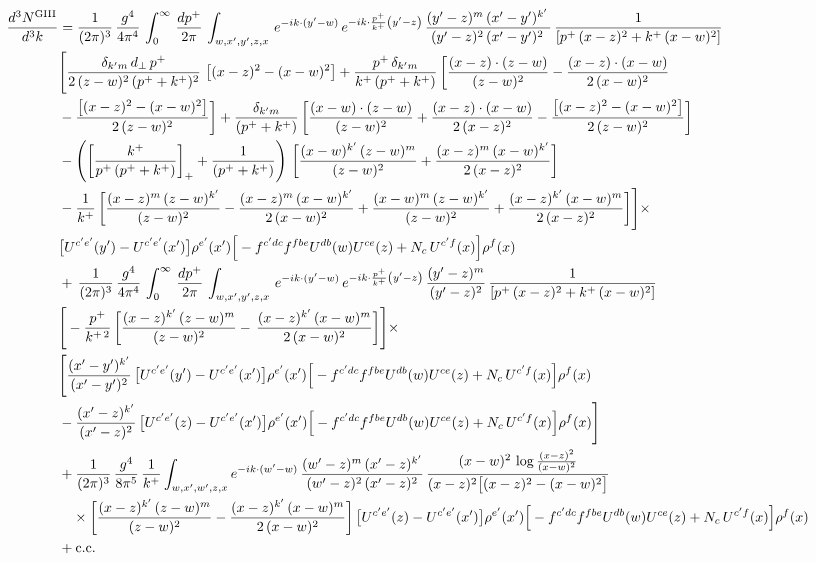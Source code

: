 \documentclass[9pt]{article}
\numberwithin{equation}{section}
\begin{document}
\begin{align}
\frac{d^{3}N^{\rm GIII}}{d^{3}k} & =  \frac{1}{(2\pi)^{3}}\,\frac{g^{4}}{4\pi^{4}}\,\int_{0}^{\infty}\, \frac{dp^{+}}{2\pi}\,\int_{w,x',y',z,x}\, e^{-ik\cdot (y'-w)}\,e^{-ik\cdot \frac{p^{+}}{k^{+}}\left(y'-z\right)}\, \frac{(y'-z)^{m}\,(x'-y')^{k'}\,}{(y'-z)^{2}\,(x'-y')^{2}\,}\, \frac{1}{\left[p^{+}\,(x-z)^{2}+k^{+}\,(x-w)^{2}\right]}\notag \\ & \Bigg[\frac{\delta_{k'm}\,d_{\perp}\,p^{+}}{2\,(z-w)^{2}\,(p^{+}+k^{+})^{2}}\, \left[(x-z)^{2}-(x-w)^{2}\right]+\frac{p^{+}\,\delta_{k'm}}{k^{+}\,(p^{+}+k^{+})}\,\bigg[\frac{(x-z)\cdot (z-w)}{(z-w)^{2}} -\frac{(x-z)\cdot (x-w)}{2\,(x-w)^{2}}\notag \\ & -\frac{\left[(x-z)^{2}-(x-w)^{2}\right]}{2\,(z-w)^{2}}\bigg] +\frac{\delta_{k'm}}{(p^{+}+k^{+})}\,\bigg[\frac{(x-w)\cdot (z-w)}{(z-w)^{2}}+\frac{(x-z)\cdot (x-w)}{2\,(x-z)^{2}} -\frac{\left[(x-z)^{2}-(x-w)^{2}\right]}{2\,(z-w)^{2}}\bigg]\notag \\ & -\left(\left[\frac{k^{+}}{p^{+}\,(p^{+}+k^{+})}\right]_{+}+\frac{1}{(p^{+}+k^{+})}\right)\,\bigg[\frac{(x-w)^{k'}\,(z-w)^{m}}{(z-w)^{2}}+\frac{(x-z)^{m}\,(x-w)^{k'}}{2\,(x-z)^{2}}\bigg]\notag \\ & -\frac{1}{k^{+}}\,\bigg[\frac{(x-z)^{m}\,(z-w)^{k'}}{(z-w)^{2}}-\frac{(x-z)^{m}\,(x-w)^{k'}}{2\,(x-w)^{2}}+\frac{(x-w)^{m}\,(z-w)^{k'}}{(z-w)^{2}} +\frac{(x-z)^{k'}\,(x-w)^{m}}{2\,(x-z)^{2}}\bigg]\Bigg]\times\,\notag \\ & \big[U^{c'e'}(y')-U^{c'e'}(x')\big]\rho^{e'}(x')\Big[-f^{c'dc}f^{fbe}U^{db}(w)U^{ce}(z)+N_{c}\,U^{c'f}(x)\Big]\rho^{f}(x) \notag \\ &   +\,\frac{1}{(2\pi)^{3}}\,\frac{g^{4}}{4\pi^{4}}\,\int_{0}^{\infty}\, \frac{dp^{+}}{2\pi}\,\int_{w,x',y',z,x}\, e^{-ik\cdot (y'-w)}\,e^{-ik\cdot \frac{p^{+}}{k^{+}}\left(y'-z\right)}\, \frac{(y'-z)^{m}}{(y'-z)^{2}}\, \frac{1}{\left[p^{+}\,(x-z)^{2}+k^{+}\,(x-w)^{2}\right]}\notag \\ &   \Bigg[ -\frac{p^{+}}{k^{+\,2}}\,\bigg[\frac{(x-z)^{k'}\,(z-w)^{m}}{(z-w)^{2}} -\,\frac{(x-z)^{k'}\,(x-w)^{m}}{2\,(x-w)^{2}}\bigg] \Bigg]\times\,\notag \\ &  \Bigg[\frac{(x'-y')^{k'}}{(x'-y')^{2}}\,\big[U^{c'e'}(y')-U^{c'e'}(x')\big]\rho^{e'}(x')\Big[-f^{c'dc}f^{fbe}U^{db}(w)U^{ce}(z)+N_{c}\,U^{c'f}(x)\Big]\rho^{f}(x)\notag\\ & -\frac{(x'-z)^{k'}}{(x'-z)^{2}}\,\big[U^{c'e'}(z)-U^{c'e'}(x')\big]\rho^{e'}(x')\Big[-f^{c'dc}f^{fbe}U^{db}(w)U^{ce}(z)+N_{c}\,U^{c'f}(x)\Big]\rho^{f}(x)\Bigg] \notag \\
& +\frac{1}{(2\pi)^{3}}\,\frac{g^{4}}{8\pi^{5}}\,\frac{1}{k^{+}}\int_{w,x',w',z,x}e^{-ik\cdot(w'-w)}\,\frac{(w'-z)^{m}\,(x'-z)^{k'}}{(w'-z)^{2}\,(x'-z)^{2}}\,\frac{(x-w)^{2}\,\log\frac{(x-z)^{2}}{(x-w)^{2}}}{(x-z)^{2}\big[(x-z)^{2}-(x-w)^{2}\big]}\notag\\
&\quad\times\bigg[\frac{(x-z)^{k'}\,(z-w)^{m}}{(z-w)^{2}}-\frac{(x-z)^{k'}\,(x-w)^{m}}{2\,(x-w)^{2}}\bigg]\,\big[U^{c'e'}(z)-U^{c'e'}(x')\big]\rho^{e'}(x')\Big[-f^{c'dc}f^{fbe}U^{db}(w)U^{ce}(z)+N_{c}\,U^{c'f}(x)\Big]\rho^{f}(x)\notag\\
&+{\rm c.c.}
\end{align}
\end{document}
